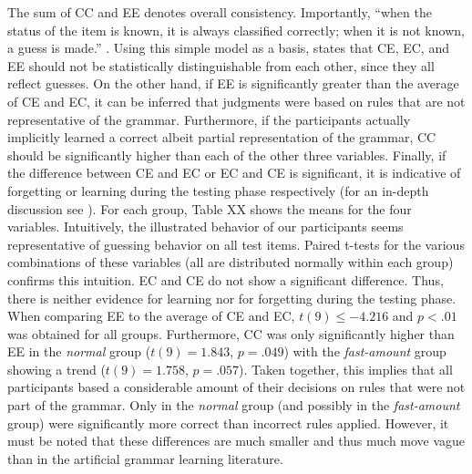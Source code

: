 The sum of CC and EE denotes overall consistency. Importantly, ``when the status of the item is known, it is always classified correctly; when it is not known, a guess is made.'' \citep[p.~227]{reber1989implicit}. Using this simple model as a basis, \citeauthor{reber1989implicit} states that CE, EC, and EE should not be statistically distinguishable from each other, since they all reflect guesses. On the other hand, if EE is significantly greater than the average of CE and EC, it can be inferred that judgments were based on rules that are not representative of the grammar. Furthermore, if the participants actually implicitly learned a correct albeit partial representation of the grammar, CC should be significantly higher than each of the other three variables. Finally, if the difference between CE and EC or EC and CE is significant, it is indicative of forgetting or learning during the testing phase respectively (for an in-depth discussion see \citet{reber1989implicit}). For each group, Table XX shows the means for the four variables. Intuitively, the illustrated behavior of our participants seems representative of guessing behavior on all test items. Paired t-tests for the various combinations of these variables (all are distributed normally within each group) confirms this intuition. EC and CE do not show a significant difference. Thus, there is neither evidence for learning nor for forgetting during the testing phase. When comparing EE to the average of CE and EC, $t(9) \leq -4.216$ and $p < .01$ was obtained for all groups. Furthermore, CC was only significantly higher than EE in the \textit{normal} group ($t(9)=1.843$, $p=.049$) with the \textit{fast-amount} group showing a trend ($t(9)=1.758$, $p=.057$). Taken together, this implies that all participants based a considerable amount of their decisions on rules that were not part of the grammar. Only in the \textit{normal} group (and possibly in the \textit{fast-amount} group) were significantly more correct than incorrect rules applied. However, it must be noted that these differences are much smaller and thus much move vague than in the artificial grammar learning literature.
